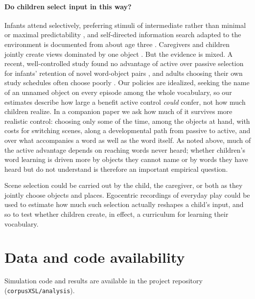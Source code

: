 \documentclass[a4paper,natbib,man]{apa6}
\begin{document}
\paragraph{Do children select input in this way?} Infants attend selectively, preferring stimuli of intermediate rather than minimal or maximal predictability \citep{Kidd:2012}, and self-directed information search adapted to the environment is documented from about age three \citep{Ruggeri:2022}. Caregivers and children jointly create views dominated by one object \citep{Yu:2009active,Suanda:2018}. But the evidence is mixed. A recent, well-controlled study found no advantage of active over passive selection for infants' retention of novel word-object pairs \citep{Bazhydai:2026}, and adults choosing their own study schedules often choose poorly \citep{Tauber:2013}. Our policies are idealized, seeking the name of an unnamed object on every episode among the whole vocabulary, so our estimates describe how large a benefit active control \textit{could} confer, not how much children realize. In a companion paper we ask how much of it survives more realistic control: choosing only some of the time, among the objects at hand, with costs for switching scenes, along a developmental path from passive to active, and over what accompanies a word as well as the word itself. As noted above, much of the active advantage depends on reaching words never heard; whether children's word learning is driven more by objects they cannot name or by words they have heard but do not understand is therefore an important empirical question.

Scene selection could be carried out by the child, the caregiver, or both as they jointly choose objects and places. Egocentric recordings of everyday play \citep{Yu:2009active,Suanda:2018,Smith:2018} could be used to estimate how much such selection actually reshapes a child's input, and so to test whether children create, in effect, a curriculum for learning their vocabulary.

\section*{Data and code availability}
Simulation code and results are available in the project repository (\texttt{corpusXSL/analysis}).


\setlength{\bibleftmargin}{.125in}
\setlength{\bibindent}{-\bibleftmargin}


\appendix
\end{document}
